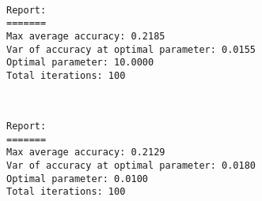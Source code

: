 \documentclass[11pt]{article}
\begin{document}
    \begin{center}
    \end{center}
    { \hspace*{\fill} \\}
    
    \begin{Verbatim}[commandchars=\\\{\}]
Report:
=======
Max average accuracy: 0.2185
Var of accuracy at optimal parameter: 0.0155
Optimal parameter: 10.0000
Total iterations: 100

    \end{Verbatim}

    \begin{center}
    \end{center}
    { \hspace*{\fill} \\}
    
    \begin{Verbatim}[commandchars=\\\{\}]
Report:
=======
Max average accuracy: 0.2129
Var of accuracy at optimal parameter: 0.0180
Optimal parameter: 0.0100
Total iterations: 100

    \end{Verbatim}
\end{document}
